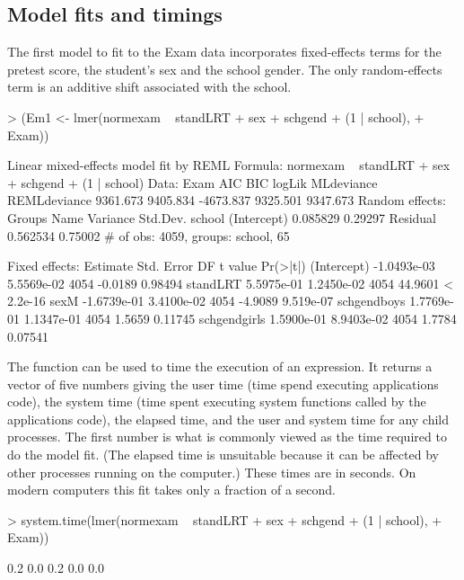 \documentclass[12pt]{article}
\begin{document}
\subsection{Model fits and timings}
\label{sec:ExamFits}

The first model to fit to the Exam data incorporates fixed-effects
terms for the pretest score, the student's sex and the school gender.
The only random-effects term is an additive shift associated with the
school.

\begin{Schunk}
\begin{Sinput}
> (Em1 <- lmer(normexam ~ standLRT + sex + schgend + (1 | school), 
+     Exam))
\end{Sinput}
\begin{Soutput}
Linear mixed-effects model fit by REML
Formula: normexam ~ standLRT + sex + schgend + (1 | school) 
   Data: Exam 
      AIC      BIC    logLik MLdeviance REMLdeviance
 9361.673 9405.834 -4673.837   9325.501     9347.673
Random effects:
 Groups   Name        Variance Std.Dev.
 school   (Intercept) 0.085829 0.29297 
 Residual             0.562534 0.75002 
# of obs: 4059, groups: school, 65

Fixed effects:
                Estimate  Std. Error   DF t value  Pr(>|t|)
(Intercept)  -1.0493e-03  5.5569e-02 4054 -0.0189   0.98494
standLRT      5.5975e-01  1.2450e-02 4054 44.9601 < 2.2e-16
sexM         -1.6739e-01  3.4100e-02 4054 -4.9089 9.519e-07
schgendboys   1.7769e-01  1.1347e-01 4054  1.5659   0.11745
schgendgirls  1.5900e-01  8.9403e-02 4054  1.7784   0.07541
\end{Soutput}
\end{Schunk}

The  function can be used to time the execution of
an \RR{} expression.  It returns a vector of five numbers giving the
user time (time spend executing applications code), the system time
(time spent executing system functions called by the applications
code), the elapsed time, and the user and system time for any child
processes.  The first number is what is commonly viewed as the time
required to do the model fit.  (The elapsed time is unsuitable because
it can be affected by other processes running on the computer.)  These
times are in seconds.  On modern computers this fit takes only a
fraction of a second.

\begin{Schunk}
\begin{Sinput}
> system.time(lmer(normexam ~ standLRT + sex + schgend + (1 | school), 
+     Exam))
\end{Sinput}
\begin{Soutput}
[1] 0.2 0.0 0.2 0.0 0.0
\end{Soutput}
\end{Schunk}
\end{document}
